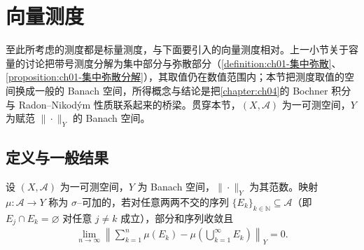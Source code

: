 \documentclass[../../main.tex]{subfiles}%
\begin{document}
\section{向量测度}\label{section:ch01-向量测度}

至此所考虑的测度都是标量测度，与下面要引入的向量测度相对。上一小节关于容量的讨论把带号测度分解为集中部分与弥散部分（\cref{definition:ch01-集中弥散}、\cref{proposition:ch01-集中弥散分解}），其取值仍在数值范围内；本节把测度取值的空间换成一般的 Banach 空间，所得概念与结论是把\cref{chapter:ch04}的 Bochner 积分与 Radon--Nikodým 性质联系起来的桥梁。贯穿本节，$(X,\mathcal{A})$ 为一可测空间，$Y$ 为赋范 $\|\cdot\|_Y$ 的 Banach 空间。

\subsection{定义与一般结果}\label{subsection:ch01-向量测度定义}

\begin{definition}\label{definition:ch01-向量sigma可加}
设 $(X,\mathcal{A})$ 为一可测空间，$Y$ 为 Banach 空间，$\|\cdot\|_Y$ 为其范数。映射 $\mu:\mathcal{A}\to Y$ 称为 $\sigma$--可加的，若对任意两两不交的序列 $\{E_k\}_{k\in\mathbb{N}}\subseteq\mathcal{A}$（即 $E_j\cap E_k=\varnothing$ 对任意 $j\neq k$ 成立），部分和序列收敛且
\begin{align}
\lim_{n\to\infty}\left\|\sum_{k=1}^n\mu(E_k)-\mu\left(\bigcup_{k=1}^\infty E_k\right)\right\|_Y=0. \label{align:ch01-向量sigma可加}
\end{align}
\end{definition}
\end{document}
